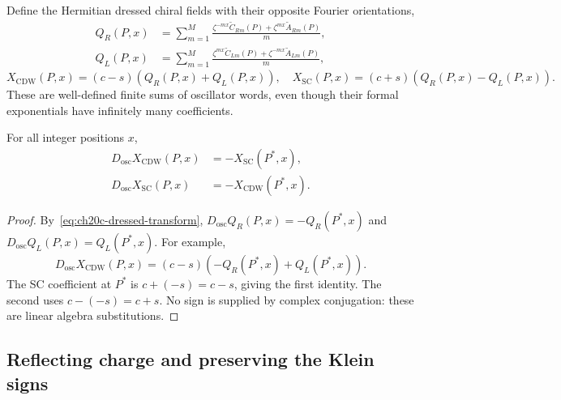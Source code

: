 Define the Hermitian dressed chiral fields with their opposite
Fourier orientations,
\begin{align}
 Q_R(P,x)&=\sum_{m=1}^{M}\frac{
  \zeta^{-mx}\widetilde C_{Rm}(P)
 +\zeta^{mx}\widetilde A_{Rm}(P)}{m},\nonumber\\
 Q_L(P,x)&=\sum_{m=1}^{M}\frac{
  \zeta^{mx}\widetilde C_{Lm}(P)
 +\zeta^{-mx}\widetilde A_{Lm}(P)}{m},
 \label{eq:ch20c-Q}\end{align}
\begin{equation}
 X_{\mathrm{CDW}}(P,x)=(c-s)(Q_R(P,x)+Q_L(P,x)),\quad
 X_{\mathrm{SC}}(P,x)=(c+s)(Q_R(P,x)-Q_L(P,x)).
 \label{eq:ch20c-X}
\end{equation}
These are well-defined finite sums of oscillator words, even though
their formal exponentials have infinitely many coefficients.
\begin{corollary}
\label{cor:ch20c-X}
For all integer positions $x$,
\begin{align}
 D_{\mathrm{osc}}X_{\mathrm{CDW}}(P,x)
  &=-X_{\mathrm{SC}}(P^*,x),\nonumber\\
 D_{\mathrm{osc}}X_{\mathrm{SC}}(P,x)
  &=-X_{\mathrm{CDW}}(P^*,x).
 \label{eq:ch20c-Xtransform}
\end{align}
\end{corollary}
\begin{proof}
By~\eqref{eq:ch20c-dressed-transform},
$D_{\mathrm{osc}}Q_R(P,x)=-Q_R(P^*,x)$ and
$D_{\mathrm{osc}}Q_L(P,x)=Q_L(P^*,x)$.
For example,
\[
 D_{\mathrm{osc}}X_{\mathrm{CDW}}(P,x)
 =(c-s)(-Q_R(P^*,x)+Q_L(P^*,x)).
\]
The SC coefficient at $P^*$ is $c+(-s)=c-s$, giving the first
identity.  The second uses $c-(-s)=c+s$.  No sign is supplied by
complex conjugation: these are linear algebra substitutions.
\end{proof}

\subsection{Reflecting charge and preserving the Klein signs}
\label{subsec:ch20c-charge}

